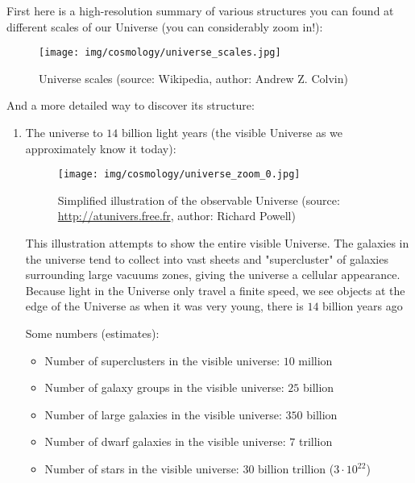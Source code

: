 	First here is a high-resolution summary of various structures you can found at different scales of our Universe (you can considerably zoom in!):
	\begin{figure}[H]
		\centering
		\texttt{[image: img/cosmology/universe\_scales.jpg]}
		\caption[Universe scales]{Universe scales (source: Wikipedia, author: Andrew Z. Colvin)}
	\end{figure}
	And a more detailed way to discover its structure:
	\begin{enumerate}
		\item The universe to $14$ billion light years (the visible Universe as we approximately know it today):
		\begin{figure}[H]
			\centering
			\texttt{[image: img/cosmology/universe\_zoom\_0.jpg]}
			\caption[Simplified illustration of the observable Universe]{Simplified illustration of the observable Universe (source: \url{http://atunivers.free.fr}, author: Richard Powell)}
		\end{figure}
		This illustration attempts to show the entire visible Universe. The galaxies in the universe tend to collect into vast sheets and "supercluster" of galaxies surrounding large vacuums zones, giving the universe a cellular appearance. Because light in the Universe only travel a finite speed, we see objects at the edge of the Universe as when it was very young, there is $14$ billion years ago

		Some numbers (estimates):
		\begin{itemize}
			\item Number of superclusters in the visible universe: $10$ million
			\item Number of galaxy groups in the visible universe: $25$ billion
			\item Number of large galaxies in the visible universe: $350$ billion
			\item Number of dwarf galaxies in the visible universe: $7$ trillion
			\item Number of stars in the visible universe: $30$ billion trillion  ($3\cdot 10^{22}$)
		\end{itemize}
		

\end{enumerate}
